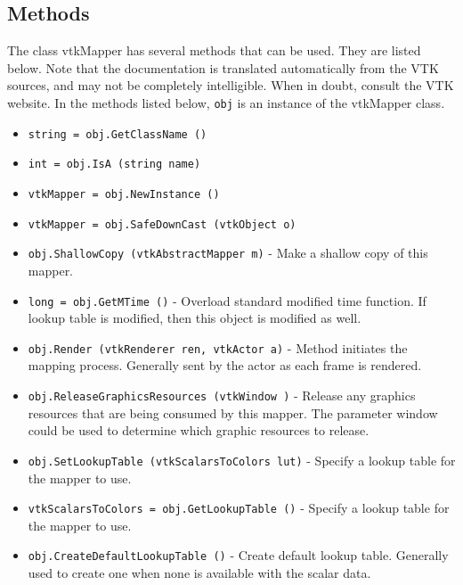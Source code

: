 \subsection{Methods}

The class vtkMapper has several methods that can be used.
  They are listed below.
Note that the documentation is translated automatically from the VTK sources,
and may not be completely intelligible.  When in doubt, consult the VTK website.
In the methods listed below, \verb|obj| is an instance of the vtkMapper class.
\begin{itemize}
\item  \verb|string = obj.GetClassName ()|

\item  \verb|int = obj.IsA (string name)|

\item  \verb|vtkMapper = obj.NewInstance ()|

\item  \verb|vtkMapper = obj.SafeDownCast (vtkObject o)|

\item  \verb|obj.ShallowCopy (vtkAbstractMapper m)| -  Make a shallow copy of this mapper.

\item  \verb|long = obj.GetMTime ()| -  Overload standard modified time function. If lookup table is modified,
 then this object is modified as well.

\item  \verb|obj.Render (vtkRenderer ren, vtkActor a)| -  Method initiates the mapping process. Generally sent by the actor 
 as each frame is rendered.

\item  \verb|obj.ReleaseGraphicsResources (vtkWindow )| -  Release any graphics resources that are being consumed by this mapper.
 The parameter window could be used to determine which graphic
 resources to release.

\item  \verb|obj.SetLookupTable (vtkScalarsToColors lut)| -  Specify a lookup table for the mapper to use.

\item  \verb|vtkScalarsToColors = obj.GetLookupTable ()| -  Specify a lookup table for the mapper to use.

\item  \verb|obj.CreateDefaultLookupTable ()| -  Create default lookup table. Generally used to create one when none
 is available with the scalar data.


\end{itemize}

